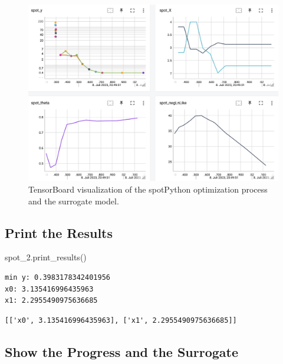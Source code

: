 \documentclass[
  letterpaper,
  DIV=11,
  numbers=noendperiod]{scrreprt}
\newenvironment{Shaded}{\begin{snugshade}}{\end{snugshade}}
\newcommand{\NormalTok}[1]{\textcolor[rgb]{0.00,0.23,0.31}{#1}}
\begin{document}
\begin{figure}

{\centering \includegraphics[width=1\textwidth,height=\textheight]{figures_static/04_tensorboard_01.png}

}

\caption{TensorBoard visualization of the spotPython optimization
process and the surrogate model.}

\end{figure}

\hypertarget{print-the-results-2}{%
\subsection{Print the Results}\label{print-the-results-2}}

\begin{Shaded}
\begin{Highlighting}[]
\NormalTok{spot\_2.print\_results()}
\end{Highlighting}
\end{Shaded}

\begin{verbatim}
min y: 0.3983178342401956
x0: 3.135416996435963
x1: 2.2955490975636685
\end{verbatim}

\begin{verbatim}
[['x0', 3.135416996435963], ['x1', 2.2955490975636685]]
\end{verbatim}

\hypertarget{show-the-progress-and-the-surrogate}{%
\subsection{Show the Progress and the
Surrogate}\label{show-the-progress-and-the-surrogate}}
\end{document}
